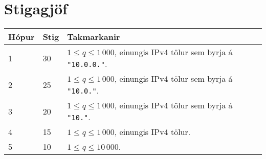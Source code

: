 \section*{Stigagjöf}
\begin{tabular}{|l|l|l|}
\hline
Hópur & Stig & Takmarkanir \\ \hline
1     & 30   & $1 \leq q \leq 1\,000$, einungis IPv4 tölur sem byrja á \texttt{"10.0.0."}. \\ \hline
2     & 25   & $1 \leq q \leq 1\,000$, einungis IPv4 tölur sem byrja á \texttt{"10.0."}. \\ \hline
3     & 20   & $1 \leq q \leq 1\,000$, einungis IPv4 tölur sem byrja á \texttt{"10."}. \\ \hline
4     & 15   & $1 \leq q \leq 1\,000$, einungis IPv4 tölur. \\ \hline
5     & 10   & $1 \leq q \leq 10\,000$. \\ \hline
\end{tabular}

